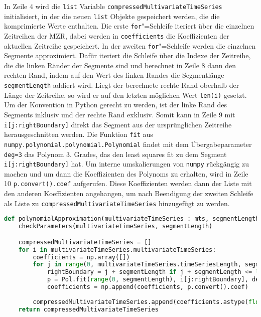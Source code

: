 In Zeile 4 wird die \lstinline|list| Variable \lstinline|compressedMultivariateTimeSeries| initialisiert, in der die neuen \lstinline|list| Objekte gespeichert werden, die die komprimierte Werte enthalten. Die erste \lstinline|for|"=Schleife iteriert über die einzelnen Zeitreihen der \ac{MZR}, dabei werden in \lstinline|coefficients| die Koeffizienten der aktuellen Zeitreihe gespeichert. In der zweiten \lstinline|for|"=Schleife werden die einzelnen Segmente approximiert. Dafür iteriert die Schleife über die Indexe der Zeitreihe, die die linken Ränder der Segmente sind und berechnet in Zeile 8 dann den rechten Rand, indem auf den Wert des linken Randes die Segmentlänge \lstinline|segmentLength| addiert wird. Liegt der berechnete rechte Rand oberhalb der Länge der Zeitreihe, so wird er auf den letzten möglichen Wert \lstinline|len(i)| gesetzt. Um der Konvention in Python gerecht zu werden, ist der linke Rand des Segments inklusiv und der rechte Rand exklusiv. Somit kann in Zeile 9 mit \lstinline|i[j:rightBoundary]| direkt das Segment aus der ursprünglichen Zeitreihe herausgeschnitten werden. Die Funktion \lstinline|fit| aus \lstinline|numpy.polynomial.polynomial.Polynomial| findet mit dem Übergabeparameter \lstinline|deg=3| das Polynom 3. Grades, das den least squares fit zu dem Segment \lstinline|i[j:rightBoundary]| hat. Um interne umskalierungen von \lstinline|numpy| rückgängig zu machen und um dann die Koeffizienten des Polynoms zu erhalten, wird in Zeile 10 \lstinline|p.convert().coef| aufgerufen. Diese Koeffizienten werden dann der Liste mit den anderen Koeffizienten angehangen, um nach Beendigung der zweiten Schleife als Liste zu \lstinline|compressedMultivariateTimeSeries| hinzugefügt zu werden.
\begin{lstlisting}[caption=Stückweise polynomielle Approximation, label=lst:stückweisepolynomielleapproximation, style=Python, language=Python]
def polynomialApproximation(multivariateTimeSeries : mts, segmentLength : int):
    checkParameters(multivariateTimeSeries, segmentLength)

    compressedMultivariateTimeSeries = []
    for i in multivariateTimeSeries.multivariateTimeSeries:
        coefficients = np.array([])
        for j in range(0, multivariateTimeSeries.timeSeriesLength, segmentLength):
            rightBoundary = j + segmentLength if j + segmentLength <= len(i) else len(i)
            p = Pol.fit(range(0, segmentLength), i[j:rightBoundary], deg=3)
            coefficients = np.append(coefficients, p.convert().coef)
        
        compressedMultivariateTimeSeries.append(coefficients.astype(float).tolist())
    return compressedMultivariateTimeSeries
\end{lstlisting}

